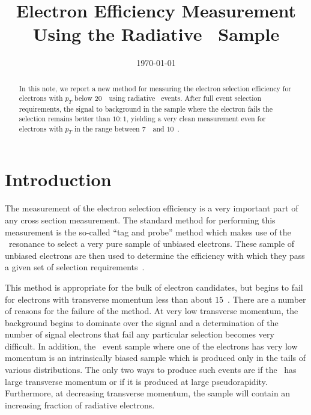 \documentclass{cmspaper}
\begin{document}
\begin{titlepage}


  \date{\today}

  \title{Electron Efficiency Measurement Using the Radiative \ZToEEGamma\ Sample}

  

  \begin{abstract}
  In this note, we report a new method for measuring the electron selection efficiency for
  electrons with $p_{T}$ below $20$~\GeV\ using radiative \ZToEEGamma\ events. After full
  event selection requirements, the signal to background in the sample where the electron
  fails the selection remains better than $10:1$, yielding a very clean measurement even
  for electrons with $p_{T}$ in the range between $7$~\GeV\ and $10$~\GeV .
  \end{abstract} 

\end{titlepage}
\tableofcontents
\newpage 

\section{Introduction}
  \label{sec:intro}

The measurement of the electron selection efficiency is a very important part of any cross section measurement.
The standard method for performing this measurement is the so-called ``tag and probe'' method which makes
use of the \ZToEE\ resonance to select a very pure sample of unbiased electrons. These sample of unbiased 
electrons are then used to determine the efficiency with which they pass a given set of selection
requirements~\cite{ZeeTagAndProbeEGamma,ZeeTagAndProbe2010,ZeeTagAndProbeTool}.

This method is appropriate for the bulk of electron candidates, but begins to fail for
electrons with transverse momentum less than about $15$~\GeV . There are a number of reasons for the failure
of the method. At very low transverse momentum, the background begins to dominate over the signal and a determination
of the number of signal electrons that fail any particular selection becomes very difficult. In addition, the
\ZToEE\ event sample where one of the electrons has very low momentum is an intrinsically biased sample which
is produced only in the tails of various distributions. The only 
two ways to produce such events are if the \Z\ has large transverse momentum or if it is produced at large
pseudorapidity. Furthermore, at decreasing transverse momentum, the sample will contain an increasing fraction 
of radiative electrons. 
\end{document}
